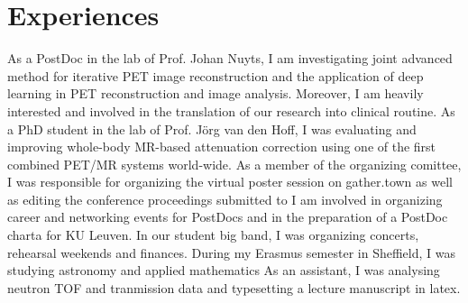 \documentclass[10pt,a4paper,sans]{moderncv}   %
\begin{document}
\section{Experiences}
        {}
        {As a PostDoc in the lab of Prof. Johan Nuyts, I am investigating
        joint advanced method for iterative PET image reconstruction and the application
        of deep learning in PET reconstruction and image analysis.
        Moreover, I am heavily interested and involved in the translation of our research
        into clinical routine.}
        {}{}
        {}
        {As a PhD student in the lab of Prof. J\"org van den Hoff, I was evaluating
         and improving whole-body MR-based attenuation correction using one of
         the first combined PET/MR systems world-wide.}
        {As a member of the organizing comittee, I was responsible for organizing the virtual
         poster session on gather.town as well as editing the conference proceedings submitted
         to \href{https://arxiv.org/abs/2110.04143}{\color{color1}{arvix}}}
        {I am involved in organizing career and networking events for PostDocs and
         in the preparation of a PostDoc charta for KU Leuven.}
       {In our student big band, I was organizing concerts, rehearsal weekends and finances.}
        {}
        {During my Erasmus semester in Sheffield, I was studying astronomy and applied mathematics}
        {}{As an assistant, I was analysing neutron TOF and tranmission data and typesetting
        a lecture manuscript in latex.}
\end{document}
